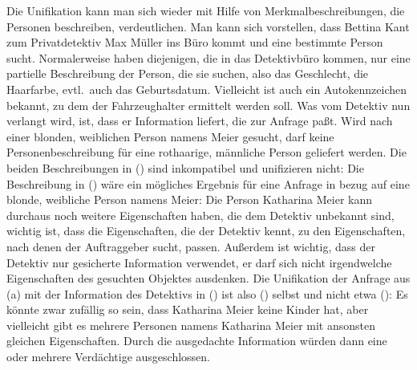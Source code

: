 Die Unifikation kann man sich wieder mit Hilfe von Merkmalbeschreibungen, die Personen beschreiben, verdeutlichen.
Man kann sich vorstellen, dass Bettina Kant zum Privatdetektiv Max Müller ins Büro kommt und eine
bestimmte Person sucht. Normalerweise haben diejenigen, die in das Detektivbüro kommen, nur eine
partielle Beschreibung der Person, die sie suchen, also \zb das Geschlecht, die Haarfarbe, evtl.\
auch das Geburtsdatum. Vielleicht ist auch ein Autokennzeichen bekannt, zu dem der Fahrzeughalter
ermittelt werden soll.
Was vom Detektiv nun verlangt wird, ist, dass er Information liefert, die zur Anfrage paßt. Wird
nach einer blonden, weiblichen Person namens Meier gesucht, darf keine Personenbeschreibung für eine rothaarige,
männliche Person geliefert werden. Die beiden Beschreibungen in (\mex{1}) sind inkompatibel und unifizieren nicht:
\eal
\ex {}
\ex {}
\zl
Die Beschreibung in () wäre ein mögliches Ergebnis für eine Anfrage in bezug auf eine blonde, weibliche Person namens Meier:
\ea
{}
\z
Die Person Katharina Meier kann durchaus noch weitere Eigenschaften haben, die dem Detektiv unbekannt sind,
wichtig ist, dass die Eigenschaften, die der Detektiv kennt, zu den Eigenschaften, nach denen der Auftraggeber sucht,
passen. Außerdem ist wichtig, dass der Detektiv nur gesicherte Information verwendet, er darf sich nicht irgendwelche
Eigenschaften des gesuchten Objektes ausdenken. Die Unifikation der Anfrage aus (\mex{-1}a) mit der Information
des Detektivs in (\mex{0}) ist also (\mex{0}) selbst und nicht etwa (\mex{1}):
\ea
{}
\z
Es könnte zwar zufällig so sein, dass Katharina Meier keine Kinder hat, 
aber vielleicht gibt es mehrere Personen
namens Katharina Meier mit ansonsten gleichen Eigenschaften. 
Durch die ausgedachte Information würden dann eine oder mehrere Verdächtige ausgeschlossen.


